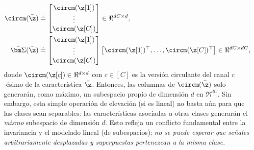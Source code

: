 \documentclass[../../book-main.tex]{subfiles}
\begin{document}
\begin{align}
    \circm(\bar{\z}) &\doteq \left[
        \begin{matrix}
            \circm(\z[1])  \\ \vdots \\ \circm(\z[C])
    \end{matrix} \right] \in \Re^{dC\times d},
    \\
    \bar{\bm \Sigma}(\bar\z) &\doteq
    \left[
        \begin{matrix}
            \circm(\z[1]) \\ \vdots \\ \circm(\z[C])
    \end{matrix} \right]\left[
        \begin{matrix}\circm(\z[1])^\top,\ldots, \circm(\z[C])^\top
    \end{matrix} \right] \in \Re^{dC\times dC},
    \label{eqn:W-multichannel}
\end{align}
donde $\circm(\z[c]) \in \Re^{d\times d}$ con $c \in [C]$ es la
versión circulante del canal $c$-ésimo de la característica $\bar \z$.
Entonces, las columnas de $\circm(\bar\z)$  solo generarán, como máximo, un
subespacio propio de dimensión $d$ en $\Re^{dC}$. Sin embargo, esta simple
operación de elevación (si es lineal) no basta aún para que las clases
sean separables: las características asociadas a otras clases generarán el
{\em mismo} subespacio de dimensión $d$. Esto refleja un conflicto fundamental
entre la invariancia y el modelado lineal (de subespacios): {\em no
    se puede esperar que señales arbitrariamente desplazadas y superpuestas pertenezcan
a la misma clase.}
\end{document}
